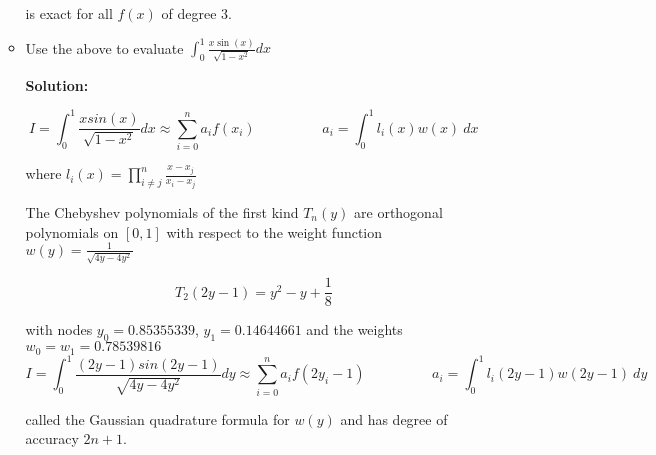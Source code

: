 \documentclass[a4paper,11pt]{report}
\begin{document}
\begin{enumerate}
\begin{itemize}
    is exact for all $f(x)$ of degree $3$.

    
        \item Use the above to evaluate $\displaystyle \int_{0}^{1} \frac{x \sin(x)}
        {\sqrt{1 - x^{2}}} dx$
    
    \textbf{Solution:}

    \begin{equation*}
    I = \int_{0}^{1} \frac{x sin(x)}{\sqrt{1-x^2}} dx \approx \sum_{i=0}^{n} a_{i} f(x_{i}) \hspace{2cm} a_{i} = \int_{0}^{1} l_{i}(x) w(x)\ dx
    \end{equation*}

    where $l_{i}(x) = \displaystyle \prod_{i \neq j}^{n} \frac{x - x_{j}}{x_{i} - x_{j}}$

    The Chebyshev polynomials of the first kind $T_{n}(y)$ are orthogonal polynomials on $[0, 1]$ with respect to the weight function $w(y) = \displaystyle \frac{1}{\sqrt{4y-4y^2}}$

    \begin{equation*}
    T_{2}(2y-1) = y^{2} - y + \frac{1}{8}
    \end{equation*}
    
    with nodes $y_{0} = 0.85355339$, $y_{1} = 0.14644661$ and the weights $w_{0} = w_{1} = 0.78539816$
    \begin{equation*}
    I = \int_{0}^{1} \frac{(2y-1) sin(2y-1)}{\sqrt{4y-4y^2}} dy \approx \sum_{i=0}^{n} a_{i} f(2y_{i} - 1) \hspace{2cm} a_{i} = \int_{0}^{1} l_{i}(2y-1) w(2y-1)\ dy
    \end{equation*} 

    called the Gaussian quadrature formula for $w(y)$ and has degree of accuracy $2n + 1$.
 

\end{itemize}
\end{enumerate}
\end{document}

